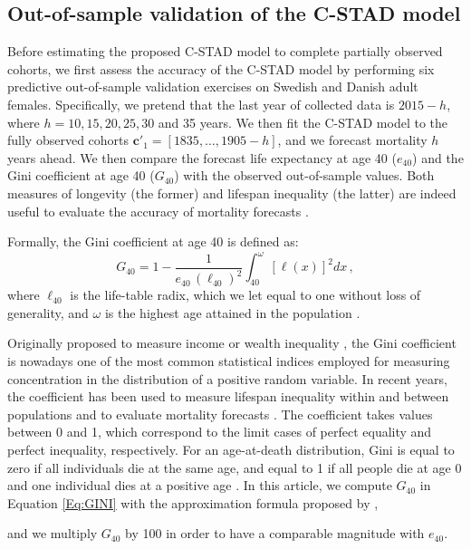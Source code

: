 \documentclass[11pt, a4paper]{article}
\begin{document}
\subsection{Out-of-sample validation of the C-STAD model}
\label{Subsec:Out-of-sample}
Before estimating the proposed C-STAD model to complete partially observed cohorts, we first assess the accuracy of the C-STAD model by performing six predictive out-of-sample validation exercises on Swedish and Danish adult females. Specifically, we pretend that the last year of collected data is $2015 - h$, where $h=10,15,20,25,30$ and 35 years. We then fit the C-STAD model to the fully observed cohorts {\color{red}$\bm{c}'_1=\left[1835,\dots,1905-h\right]$}, and we forecast mortality $h$ years ahead. We then compare the forecast life expectancy at age 40 ($e_{40}$) and the Gini coefficient at age 40 ($G_{40}$) with the observed out-of-sample values. Both measures of longevity (the former) and lifespan inequality (the latter) are indeed useful to evaluate the accuracy of mortality forecasts \citep{bohk2017lifespan}. {\color{red}Formally, the Gini coefficient at age 40 is defined as:
%
\begin{equation}\label{Eq:GINI}
G_{40} = 1 - \frac{1}{e_{40}\,\left(\ell_{40}\right)^2} \int_{40}^{\omega} \left[\ell(x)\right]^2 dx \, ,
\end{equation}
%
where $\ell_{40}$ is the life-table radix, which we let equal to one without loss of generality, and $\omega$ is the highest age attained in the population \citep{hanada1983formula,shkolnikov2003gini}.

Originally proposed to measure income or wealth inequality \citep{gini1912variabilita,gini1914sulla}, the Gini coefficient is nowadays one of the most common statistical indices employed for measuring concentration in the distribution of a positive random variable. In recent years, the coefficient has been used to measure lifespan inequality within and between populations \cite[see, e.g.,][]{shkolnikov2003gini,smits2009length,van2013perturbation,gigliarano2017longevity} and to evaluate mortality forecasts \citep{diaz2018mortality,basellini2019modelling}. The coefficient takes values between 0 and 1, which correspond to the limit cases of perfect equality and perfect inequality, respectively. For an age-at-death distribution, Gini is equal to zero if all individuals die at the same age, and equal to 1 if all people die at age 0 and one individual dies at a positive age \citep{shkolnikov2003gini}. In this article, we compute $G_{40}$ in Equation \eqref{Eq:GINI} with the approximation formula proposed by \cite{shkolnikov2003gini},} and we multiply $G_{40}$ by 100 in order to have a comparable magnitude with $e_{40}$.
\end{document}
